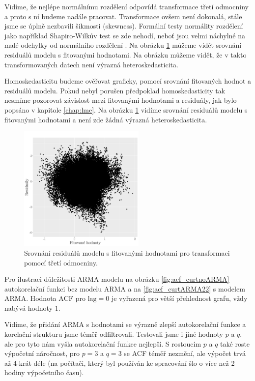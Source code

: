 Vidíme, že nejlépe normálnímu rozdělení odpovídá transformace třetí odmocniny a proto s ní budeme nadále pracovat. Transformace ovšem není dokonalá, stále jsme se úplně nezbavili šikmosti (skewness). Formální testy normálity rozdělení jako například Shapiro-Wilkův test se zde nehodí, neboť jsou velmi náchylné na malé odchylky od normálního rozdělení \parencite{shapirowilk}. Na obrázku \ref{fig:resvsfit_curt} můžeme vidět srovnání residuálů modelu s fitovanými hodnotami. Na obrázku můžeme vidět, že v takto transformovaných datech není výrazná heteroskedasticita.

Homoskedasticitu budeme ověřovat graficky, pomocí srovnání fitovaných hodnot a residuálů modelu. Pokud nebyl porušen předpoklad homoskedasticity tak nesmíme pozorovat závislost mezi fitovanými hodnotami a residuály, jak bylo popsáno v kapitole \ref{chap:lme}. Na obrázku \ref{fig:resvsfit_curt} vidíme srovnání residuálů modelu s fitovanými hodnotami a není zde žádná výrazná heteroskedasticita.

\begin{figure}
	\centering
  \includegraphics[width=0.55\textwidth]{img/ch2/modmax15cm_curt.png}
	\caption{Srovnání residuálů modelu s fitovanými hodnotami pro transformaci pomocí třetí odmocniny.}
	\label{fig:resvsfit_curt}
\end{figure}

Pro ilustraci důležitosti ARMA modelu na obrázku \ref{fig:acf_curtnoARMA} autokorelační funkci bez modelu ARMA a na \ref{fig:acf_curtARMA22} s modelem ARMA. Hodnota $\text{ACF}$ pro $\text{lag}=0$ je vyřazená pro větší přehlednost grafu, vždy nabývá hodnoty $1$.

Vidíme, že přidání ARMA s hodnotami se výrazně zlepší autokorelační funkce a korelační strukturu jsme téměř odfiltrovali. Testovali jsme i jiné hodnoty $p$ a $q$, ale pro tyto nám vyšla autokorelační funkce nejlepší. S rostoucím $p$ a $q$ také roste výpočetní náročnost, pro $p=3$ a $q=3$ se ACF téměř nezmění, ale výpočet trvá až 4-krát déle (na počítači, který byl používán ke spracování šlo o více než 2 hodiny výpočetního času).

